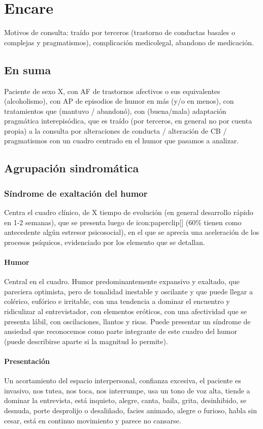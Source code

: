 \section*{Encare}
Motivos de consulta: traído por terceros (trastorno de conductas basales o complejas y pragmatismos), complicación medicolegal, abandono de medicación.
\subsection*{En suma}
Paciente de sexo X, con AF de trastornos afectivos o sus equivalentes (alcoholismo), con AP de episodios de humor en más (y/o en menos), con tratamientos que (mantuvo / abandonó), con (buena/mala) adaptación pragmática interepisódica, que es traído (por terceros, en general no por cuenta propia) a la consulta por alteraciones de conducta / alteración de CB / pragmatismos con un cuadro centrado en el humor que pasamos a analizar.
\subsection*{Agrupación sindromática}
\subsubsection*{Síndrome de exaltación del humor}
Centra el cuadro clínico, de X tiempo de evolución (en general desarrollo rápido en 1-2 semanas), que se presenta luego de icon:paperclip[] (60\% tienen como antecedente algún estresor psicosocial), en el que se aprecia una aceleración de los procesos psíquicos, evidenciado por los elemento que se detallan.
\paragraph{Humor}
Central en el cuadro. Humor predominantemente expansivo y exaltado, que pareciera optimista, pero de tonalidad inestable y oscilante y que puede llegar a colérico, eufórico e irritable, con una tendencia a dominar el encuentro y ridiculizar al entrevistador, con elementos eróticos, con una afectividad que se presenta lábil, con oscilaciones, llantos y risas. Puede presentar un síndrome de ansiedad que reconocemos como parte integrante de este cuadro del humor (puede describirse aparte si la magnitud lo permite).
\paragraph{Presentación}
Un acortamiento del espacio interpersonal, confianza excesiva, el paciente es invasivo, nos tutea, nos toca, nos interrumpe, usa un tono de voz alta, tiende a dominar la entrevista, está inquieto, alegre, canta, baila, grita, desinhibido, se desnuda, porte desprolijo o desaliñado, facies animado, alegre o furioso, habla sin cesar, está en continuo movimiento y parece no cansarse.
